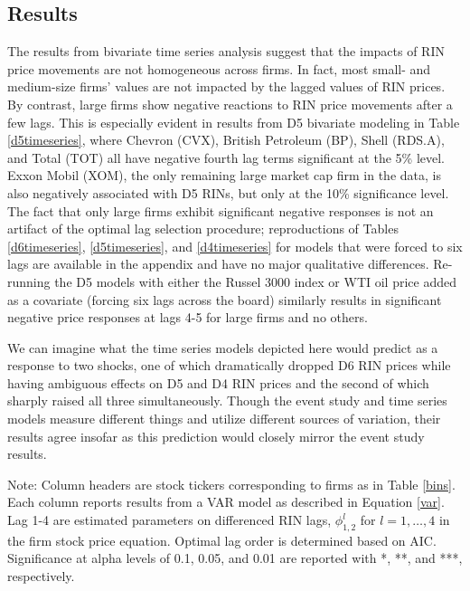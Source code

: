 \documentclass[11pt]{article}
\begin{document}
\subsection{Results}

The results from bivariate time series analysis suggest that the impacts of RIN price movements are not homogeneous across firms. In fact, most small- and medium-size firms' values are not impacted by the lagged values of RIN prices. By contrast, large firms show negative reactions to RIN price movements after a few lags. This is especially evident in results from D5 bivariate modeling in Table \ref{d5timeseries}, where Chevron (CVX), British Petroleum (BP), Shell (RDS.A), and Total (TOT) all have negative fourth lag terms significant at the 5\% level. Exxon Mobil (XOM), the only remaining large market cap firm in the data, is also negatively associated with D5 RINs, but only at the 10\% significance level. The fact that only large firms exhibit significant negative responses is not an artifact of the optimal lag selection procedure; reproductions of Tables \ref{d6timeseries}, \ref{d5timeseries}, and \ref{d4timeseries} for models that were forced to six lags are available in the appendix and have no major qualitative differences. Re-running the D5 models with either the Russel 3000 index or WTI oil price added as a covariate (forcing six lags across the board) similarly results in significant negative price responses at lags 4-5 for large firms and no others.

We can imagine what the time series models depicted here would predict as a response to two shocks, one of which dramatically dropped D6 RIN prices while having ambiguous effects on D5 and D4 RIN prices and the second of which sharply raised all three simultaneously. Though the event study and time series models measure different things and utilize different sources of variation, their results agree insofar as this prediction would closely mirror the event study results.


\begin{table}[!ht] \centering 
	\caption{Bivariate Time Series Model with D6 RINs} 
	\label{d6timeseries} 
	\begin{flushleft}
		\scriptsize{Note: Column headers are stock tickers corresponding to firms as in Table \ref{bins}. Each column reports results from a VAR model as described in Equation \ref{var}. Lag 1-4 are estimated parameters on differenced RIN lags, $\phi_{1,2}^l$ for $l=1,\dots,4$ in the firm stock price equation. Optimal lag order is determined based on AIC. Significance at alpha levels of 0.1, 0.05, and 0.01 are reported with *, **, and ***, respectively.}\\
	\end{flushleft}
\end{table} 
\end{document}
